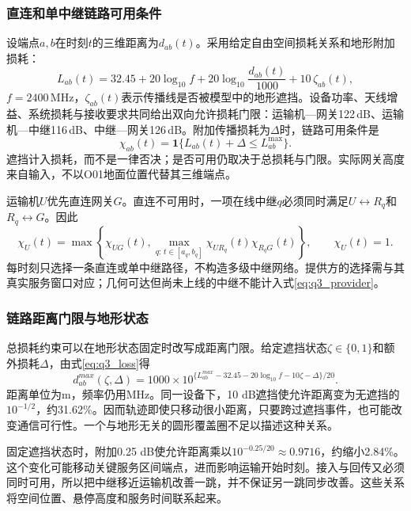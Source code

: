 \documentclass[withoutpreface,colorprint]{format}
\numberwithin{equation}{section}
\numberwithin{figure}{section}
\numberwithin{table}{section}
\begin{document}
\subsubsection{直连和单中继链路可用条件}
设端点$a,b$在时刻$t$的三维距离为$d_{ab}(t)$。采用给定自由空间损耗关系\cite{iturp525}和地形附加损耗：
\begin{equation}
 L_{ab}(t)=32.45+20\log_{10}f+20\log_{10}\frac{d_{ab}(t)}{1000}
 +10\,\zeta_{ab}(t),
\label{eq:q3_loss}
\end{equation}
$f=2400$\,MHz，$\zeta_{ab}(t)$表示传播线是否被模型中的地形遮挡。设备功率、天线增益、系统损耗与接收要求共同给出双向允许损耗门限：运输机—网关122\,dB、运输机—中继116\,dB、中继—网关126\,dB。附加传播损耗为$\Delta$时，链路可用条件是
\begin{equation}
 \chi_{ab}(t)=\mathbf1\{L_{ab}(t)+\Delta\le L_{ab}^{\max}\}.
\label{eq:q3_link}
\end{equation}
遮挡计入损耗，而不是一律否决；是否可用仍取决于总损耗与门限。实际网关高度来自输入，不以O01地面位置代替其三维端点。

运输机$U$优先直连网关$G$。直连不可用时，一项在线中继$q$必须同时满足$U\leftrightarrow R_q$和$R_q\leftrightarrow G$。因此
\begin{equation}
 \chi_U(t)=\max\left\{\chi_{UG}(t),\max_{q:\,t\in[a_q,b_q]}
 \chi_{UR_q}(t)\chi_{R_qG}(t)\right\},\qquad \chi_U(t)=1.
\label{eq:q3_provider}
\end{equation}
每时刻只选择一条直连或单中继路径，不构造多级中继网络。提供方的选择需与其真实服务窗口对应；几何可达但尚未上线的中继不能计入式\eqref{eq:q3_provider}。


\subsubsection{链路距离门限与地形状态}
总损耗约束可以在地形状态固定时改写成距离门限。给定遮挡状态$\zeta\in\{0,1\}$和额外损耗$\Delta$，由式\eqref{eq:q3_loss}得
\begin{equation}
 d_{ab}^{max}(\zeta,\Delta)=1000\times10^{\{L_{ab}^{max}-32.45-20\log_{10}f-10\zeta-\Delta\}/20}.
 \label{eq:q3_range_threshold}
\end{equation}
距离单位为m，频率仍用MHz。同一设备下，10 dB遮挡使允许距离变为无遮挡的$10^{-1/2}$，约31.62\%。因而轨迹即使只移动很小距离，只要跨过遮挡事件，也可能改变通信可行性。一个与地形无关的圆形覆盖圈不足以描述这种关系。

固定遮挡状态时，附加0.25 dB使允许距离乘以$10^{-0.25/20}\approx0.9716$，约缩小2.84\%。这个变化可能移动关键服务区间端点，进而影响运输开始时刻。接入与回传又必须同时可用，所以把中继移近运输机改善一跳，并不保证另一跳同步改善。这些关系将空间位置、悬停高度和服务时间联系起来。
\end{document}

